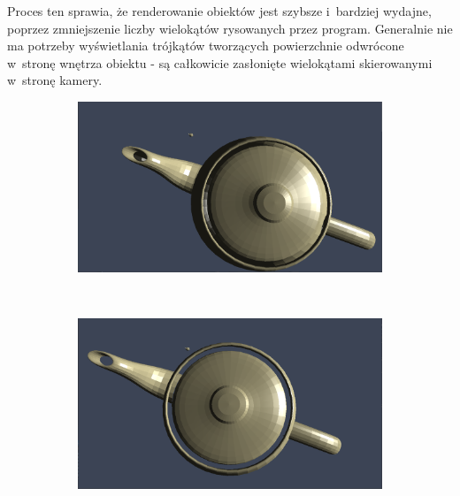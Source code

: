 \documentclass[a4paper,twoside,12pt]{book}
\begin{document}
Proces ten sprawia, że renderowanie obiektów jest szybsze i~bardziej wydajne, poprzez zmniejszenie liczby wielokątów rysowanych przez program. Generalnie nie ma potrzeby wyświetlania trójkątów tworzących powierzchnie odwrócone w~stronę wnętrza obiektu - są całkowicie zasłonięte wielokątami skierowanymi w~stronę kamery. \cite{backface_culling}

\begin{figure}[H]
    \centering
    \begin{subfigure}[b]{0.8\textwidth}
        \includegraphics[width=\textwidth]{res/backface_culling_example2.png}
        \label{fig:backface_culling_example2}
    \end{subfigure}
    ~ %
    \begin{subfigure}[b]{0.8\textwidth}
        \includegraphics[width=\textwidth]{res/backface_culling_example1.png}
        \label{fig:backface_culling_example1}
    \end{subfigure}
    \label{fig:backface_culling_example}
\end{figure}
\end{document}
